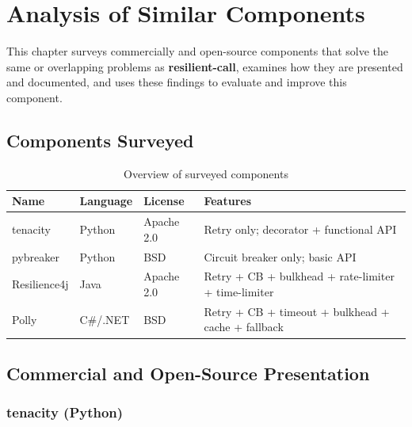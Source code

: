 \chapter{Analysis of Similar Components}
\label{ch:competitive-analysis}

This chapter surveys commercially and open-source components that solve the
same or overlapping problems as \textbf{resilient-call}, examines how they are
presented and documented, and uses these findings to evaluate and improve
this component.

\section{Components Surveyed}
\label{sec:components-surveyed}

\begin{table}[H]
    \centering
    \caption{Overview of surveyed components}
    \label{tab:competitors}
    \begin{tabularx}{\linewidth}{>{\ttfamily}l l l X}
        \toprule
        \textbf{Name} & \textbf{Language} & \textbf{License} & \textbf{Features} \\
        \midrule
        tenacity      & Python & Apache 2.0 & Retry only; decorator + functional API \\
        pybreaker      & Python & BSD         & Circuit breaker only; basic API \\
        Resilience4j  & Java   & Apache 2.0 & Retry + CB + bulkhead + rate-limiter + time-limiter \\
        Polly         & C\#/.NET & BSD       & Retry + CB + timeout + bulkhead + cache + fallback \\
        \bottomrule
    \end{tabularx}
\end{table}

\section{Commercial and Open-Source Presentation}
\label{sec:presentation-research}

\subsection{tenacity (Python)}

